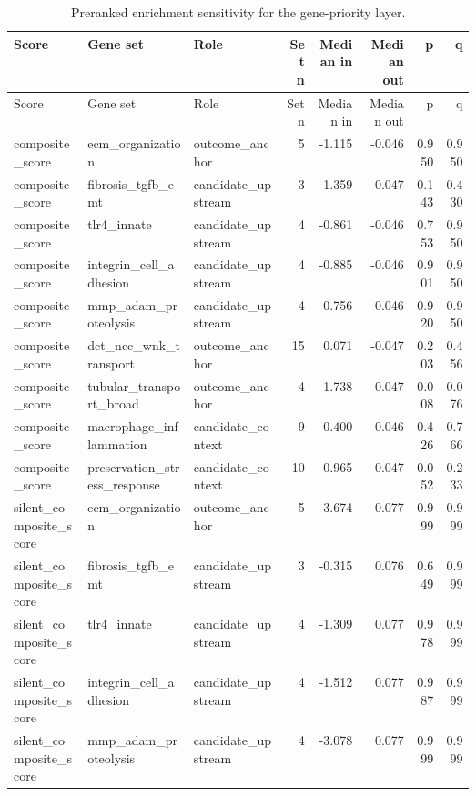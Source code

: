 \documentclass[11pt]{article}
\begin{document}
\begin{landscape}
\scriptsize
\setlength{\tabcolsep}{3pt}
\begin{longtable}{p{0.16\linewidth}p{0.23\linewidth}p{0.20\linewidth}rrrrr}
\caption{Preranked enrichment sensitivity for the gene-priority layer.}\\
\toprule
Score & Gene set & Role & Set n & Median in & Median out & p & q \\
\midrule
\endfirsthead
\toprule
Score & Gene set & Role & Set n & Median in & Median out & p & q \\
\midrule
\endhead
composite\_score & ecm\_organization & outcome\_anchor & 5 & -1.115 & -0.046 & 0.950 & 0.950 \\
composite\_score & fibrosis\_tgfb\_emt & candidate\_upstream & 3 & 1.359 & -0.047 & 0.143 & 0.430 \\
composite\_score & tlr4\_innate & candidate\_upstream & 4 & -0.861 & -0.046 & 0.753 & 0.950 \\
composite\_score & integrin\_cell\_adhesion & candidate\_upstream & 4 & -0.885 & -0.046 & 0.901 & 0.950 \\
composite\_score & mmp\_adam\_proteolysis & candidate\_upstream & 4 & -0.756 & -0.046 & 0.920 & 0.950 \\
composite\_score & dct\_ncc\_wnk\_transport & outcome\_anchor & 15 & 0.071 & -0.047 & 0.203 & 0.456 \\
composite\_score & tubular\_transport\_broad & outcome\_anchor & 4 & 1.738 & -0.047 & 0.008 & 0.076 \\
composite\_score & macrophage\_inflammation & candidate\_context & 9 & -0.400 & -0.046 & 0.426 & 0.766 \\
composite\_score & preservation\_stress\_response & candidate\_context & 10 & 0.965 & -0.047 & 0.052 & 0.233 \\
silent\_composite\_score & ecm\_organization & outcome\_anchor & 5 & -3.674 & 0.077 & 0.999 & 0.999 \\
silent\_composite\_score & fibrosis\_tgfb\_emt & candidate\_upstream & 3 & -0.315 & 0.076 & 0.649 & 0.999 \\
silent\_composite\_score & tlr4\_innate & candidate\_upstream & 4 & -1.309 & 0.077 & 0.978 & 0.999 \\
silent\_composite\_score & integrin\_cell\_adhesion & candidate\_upstream & 4 & -1.512 & 0.077 & 0.987 & 0.999 \\
silent\_composite\_score & mmp\_adam\_proteolysis & candidate\_upstream & 4 & -3.078 & 0.077 & 0.999 & 0.999 \\

\end{longtable}
\end{landscape}
\end{document}
